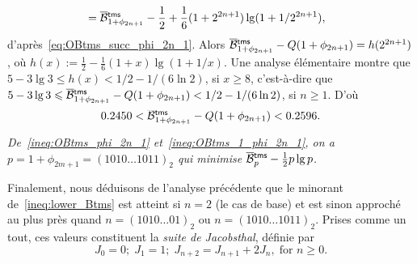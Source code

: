 \begin{itemize}
\begin{align*}
                      &= \OB{\fun{tms}}{1+\phi_{2n+1}} - \frac{1}{2}
                         + \frac{1}{6}(1+2^{2n+1})\lg(1+1/2^{2n+1}),
    \end{align*}
    d'après~\eqref{eq:OBtms_succ_phi_2n_1}. Alors
    \(\OB{\fun{tms}}{1+\phi_{2n+1}} - Q(1+\phi_{2n+1}) =
    h(2^{2n+1})\), où \(h(x) := \tfrac{1}{2} -
    \tfrac{1}{6}(1+x)\lg(1+1/x)\). Une analyse élémentaire montre que
    \(5 - 3\lg 3 \leqslant h(x) < 1/2 - 1/(6\ln 2)\), si \(x \geqslant
    8\), c'est-à-dire que \(5 - 3\lg 3 \leqslant
    \OB{\fun{tms}}{1+\phi_{2n+1}} - Q(1+\phi_{2n+1}) < 1/2 - 1/(6\ln
    2)\), si \(n \geqslant 1\). D'où
    \begin{equation}
      0.2450 < \smash{\OB{\fun{tms}}{1+\phi_{2n+1}}} -
      Q(1+\phi_{2n+1}) < 0.2596.
      \label{ineq:OBtms_1_phi_2n_1}
    \end{equation}

    \bigskip
    \noindent
    \textsl{De~\eqref{ineq:OBtms_phi_2n_1}
      et~\eqref{ineq:OBtms_1_phi_2n_1}, on a \(p = 1+\phi_{2m+1} =
      (1010\dots1011)_2\) qui minimise \(\OB{\fun{tms}}{p} -
      \tfrac{1}{2}p\lg p\).}

\end{itemize}

\bigskip

Finalement, nous déduisons de l'analyse précédente que le minorant
de~\eqref{ineq:lower_Btms} est atteint si \(n=2\) (le cas de base) et
est sinon approché au plus près quand \(n=(1010\dots01)_2\) ou
\(n=(1010\dots1011)_2\). Prises comme un tout, ces valeurs constituent
la \emph{suite de Jacobsthal},
définie par
\begin{equation}
J_0 = 0; \; J_1=1; \; J_{n+2} = J_{n+1} + 2J_{n},\; \text{for \(n
  \geqslant 0\).}
\label{eq:Jacobsthal}
\end{equation}

